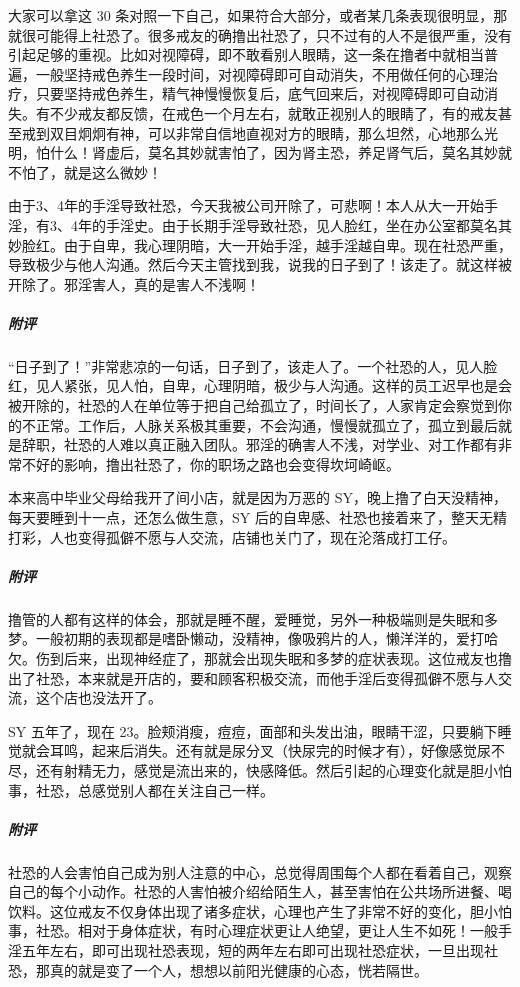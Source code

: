 大家可以拿这 30 条对照一下自己，如果符合大部分，或者某几条表现很明显，那就很可能得上社恐了。很多戒友的确撸出社恐了，只不过有的人不是很严重，没有引起足够的重视。比如对视障碍，即不敢看别人眼睛，这一条在撸者中就相当普遍，一般坚持戒色养生一段时间，对视障碍即可自动消失，不用做任何的心理治疗，只要坚持戒色养生，精气神慢慢恢复后，底气回来后，对视障碍即可自动消失。有不少戒友都反馈，在戒色一个月左右，就敢正视别人的眼睛了，有的戒友甚至戒到双目炯炯有神，可以非常自信地直视对方的眼睛，那么坦然，心地那么光明，怕什么！肾虚后，莫名其妙就害怕了，因为肾主恐，养足肾气后，莫名其妙就不怕了，就是这么微妙！

\begin{case}[社恐]
    由于3、4年的手淫导致社恐，今天我被公司开除了，可悲啊！本人从大一开始手淫，有3、4年的手淫史。由于长期手淫导致社恐，见人脸红，坐在办公室都莫名其妙脸红。由于自卑，我心理阴暗，大一开始手淫，越手淫越自卑。现在社恐严重，导致极少与他人沟通。然后今天主管找到我，说我的日子到了！该走了。就这样被开除了。邪淫害人，真的是害人不浅啊！
    \subparagraph{附评} “日子到了！”非常悲凉的一句话，日子到了，该走人了。一个社恐的人，见人脸红，见人紧张，见人怕，自卑，心理阴暗，极少与人沟通。这样的员工迟早也是会被开除的，社恐的人在单位等于把自己给孤立了，时间长了，人家肯定会察觉到你的不正常。工作后，人脉关系极其重要，不会沟通，慢慢就孤立了，孤立到最后就是辞职，社恐的人难以真正融入团队。邪淫的确害人不浅，对学业、对工作都有非常不好的影响，撸出社恐了，你的职场之路也会变得坎坷崎岖。
\end{case}

\begin{case}[社恐]
    本来高中毕业父母给我开了间小店，就是因为万恶的 SY，晚上撸了白天没精神，每天要睡到十一点，还怎么做生意，SY 后的自卑感、社恐也接着来了，整天无精打彩，人也变得孤僻不愿与人交流，店铺也关门了，现在沦落成打工仔。
    \subparagraph{附评} 撸管的人都有这样的体会，那就是睡不醒，爱睡觉，另外一种极端则是失眠和多梦。一般初期的表现都是嗜卧懒动，没精神，像吸鸦片的人，懒洋洋的，爱打哈欠。伤到后来，出现神经症了，那就会出现失眠和多梦的症状表现。这位戒友也撸出了社恐，本来就是开店的，要和顾客积极交流，而他手淫后变得孤僻不愿与人交流，这个店也没法开了。
\end{case}

\begin{case}[社恐]
    SY 五年了，现在 23。脸颊消瘦，痘痘，面部和头发出油，眼睛干涩，只要躺下睡觉就会耳鸣，起来后消失。还有就是尿分叉（快尿完的时候才有），好像感觉尿不尽，还有射精无力，感觉是流出来的，快感降低。然后引起的心理变化就是胆小怕事，社恐，总感觉别人都在关注自己一样。
    \subparagraph{附评} 社恐的人会害怕自己成为别人注意的中心，总觉得周围每个人都在看着自己，观察自己的每个小动作。社恐的人害怕被介绍给陌生人，甚至害怕在公共场所进餐、喝饮料。这位戒友不仅身体出现了诸多症状，心理也产生了非常不好的变化，胆小怕事，社恐。相对于身体症状，有时心理症状更让人绝望，更让人生不如死！一般手淫五年左右，即可出现社恐表现，短的两年左右即可出现社恐症状，一旦出现社恐，那真的就是变了一个人，想想以前阳光健康的心态，恍若隔世。
\end{case}

